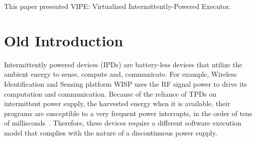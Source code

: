 \documentclass[pageno]{jpaper}
\newcommand{\sys}{VIPE\xspace}
\newcommand{\sysfull}{Virtualized Intermittently-Powered Executor\xspace}
\begin{document}
This paper presented \sys: \sysfull.


\newpage

\section{Old Introduction}
	Intermittently powered devices (IPDs) are battery-less devices that utilize the ambient energy to sense, compute and, communicate. For example, Wireless Identification and Sensing platform WISP \cite{wisp} uses the RF signal power to drive its computation and communication. Because of the reliance of TPDs on intermittent power supply, the harvested energy when it is available, their programs are susceptible to a very frequent power interrupts, in the order of tens of millisconds~\cite{}. Therefore, these devices require a different software execution model that complies with the nature of a discontinuous power supply. 
\end{document}
